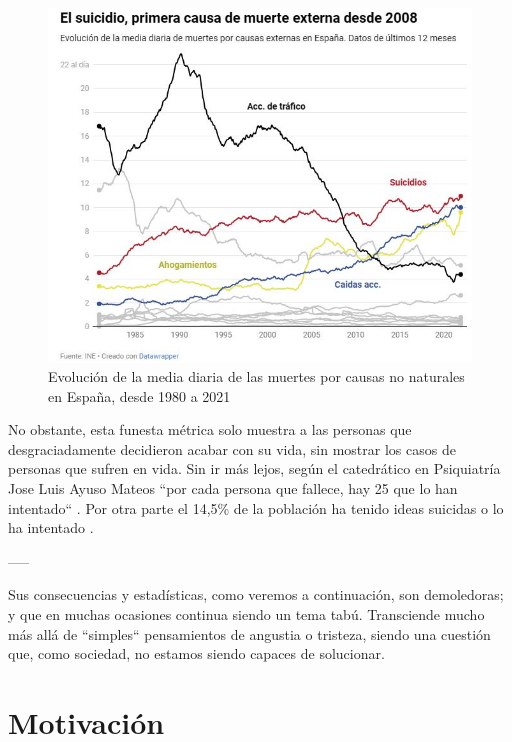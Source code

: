     \begin{figure}[h]
        \centering
        \includegraphics[width=0.85\linewidth]{figures/causas no naturales.jpg}
        \caption[Evolución de la media diaria de las muertes por causas no naturales en España, desde 1980 a 2021]{Evolución de la media diaria de las muertes por causas no naturales en España, desde 1980 a 2021 \cite{sanchez_once_2023}}
        \label{fig:intro:causas_no_naturales}
    \end{figure}

     No obstante, esta funesta métrica solo muestra a las personas que desgraciadamente decidieron acabar con su vida, sin mostrar los casos de personas que sufren en vida. Sin ir más lejos, según el catedrático en Psiquiatría Jose Luis Ayuso Mateos ``por cada persona que fallece, hay 25 que lo han intentado``  \cite{sanchez_once_2023}.  Por otra parte el 14,5\% de la población ha tenido ideas suicidas o lo ha intentado \cite{comunicacion_cuatro_2023}.

    -----

    Sus consecuencias y estadísticas, como veremos a continuación, son demoledoras; y que en muchas ocasiones continua siendo un tema tabú. Transciende mucho más allá de ``simples`` pensamientos de angustia o tristeza, siendo una cuestión que, como sociedad, no estamos siendo capaces de solucionar.
    
    
   

    


\section{Motivación}

